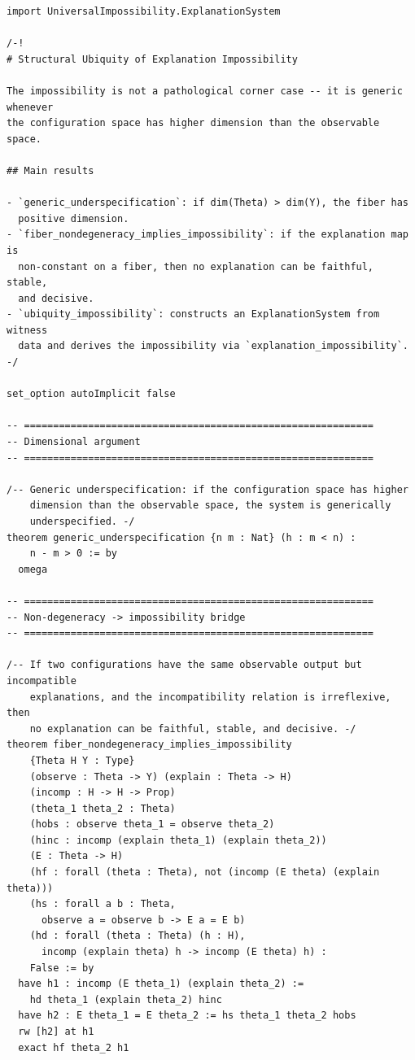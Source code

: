 \documentclass[11pt,a4paper]{article}
\begin{document}
\begin{lstlisting}[caption={Ubiquity.lean --- complete file},label={lst:ubiquity}]
import UniversalImpossibility.ExplanationSystem

/-!
# Structural Ubiquity of Explanation Impossibility

The impossibility is not a pathological corner case -- it is generic whenever
the configuration space has higher dimension than the observable space.

## Main results

- `generic_underspecification`: if dim(Theta) > dim(Y), the fiber has
  positive dimension.
- `fiber_nondegeneracy_implies_impossibility`: if the explanation map is
  non-constant on a fiber, then no explanation can be faithful, stable,
  and decisive.
- `ubiquity_impossibility`: constructs an ExplanationSystem from witness
  data and derives the impossibility via `explanation_impossibility`.
-/

set_option autoImplicit false

-- ============================================================
-- Dimensional argument
-- ============================================================

/-- Generic underspecification: if the configuration space has higher
    dimension than the observable space, the system is generically
    underspecified. -/
theorem generic_underspecification {n m : Nat} (h : m < n) :
    n - m > 0 := by
  omega

-- ============================================================
-- Non-degeneracy -> impossibility bridge
-- ============================================================

/-- If two configurations have the same observable output but incompatible
    explanations, and the incompatibility relation is irreflexive, then
    no explanation can be faithful, stable, and decisive. -/
theorem fiber_nondegeneracy_implies_impossibility
    {Theta H Y : Type}
    (observe : Theta -> Y) (explain : Theta -> H)
    (incomp : H -> H -> Prop)
    (theta_1 theta_2 : Theta)
    (hobs : observe theta_1 = observe theta_2)
    (hinc : incomp (explain theta_1) (explain theta_2))
    (E : Theta -> H)
    (hf : forall (theta : Theta), not (incomp (E theta) (explain theta)))
    (hs : forall a b : Theta,
      observe a = observe b -> E a = E b)
    (hd : forall (theta : Theta) (h : H),
      incomp (explain theta) h -> incomp (E theta) h) :
    False := by
  have h1 : incomp (E theta_1) (explain theta_2) :=
    hd theta_1 (explain theta_2) hinc
  have h2 : E theta_1 = E theta_2 := hs theta_1 theta_2 hobs
  rw [h2] at h1
  exact hf theta_2 h1


\end{lstlisting}
\end{document}
